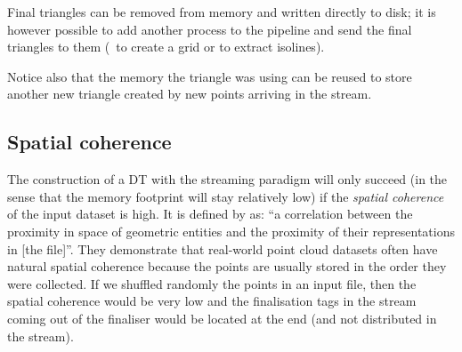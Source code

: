 %

Final triangles can be removed from memory and written directly to disk; it is however possible to add another process to the pipeline and send the final triangles to them (\eg\ to create a grid or to extract isolines).

%

Notice also that the memory the triangle was using can be reused to store another new triangle created by new points arriving in the stream.


\subsection{Spatial coherence} 

The construction of a DT with the streaming paradigm will only succeed (in the sense that the memory footprint will stay relatively low) if the \emph{spatial coherence}%
of the input dataset is high.
It is defined by  as: ``a correlation between the proximity in space of geometric entities and the proximity of their representations in [the file]''.
They demonstrate that real-world point cloud datasets often have natural spatial coherence because the points are usually stored in the order they were collected.
If we shuffled randomly the points in an input file, then the spatial coherence would be very low and the finalisation tags in the stream coming out of the finaliser would be located at the end (and not distributed in the stream).

%

